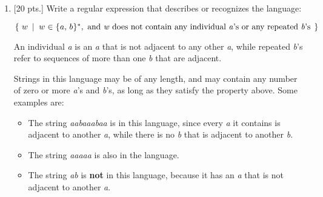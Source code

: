 \documentclass[11pt]{article}
\newcommand{\sms}{\ensuremath{\hspace{.1mm}}}
\begin{document}
  \begin{enumerate}


    \item {[20 pts.]} \label{re-question} Write a regular expression that
          describes or recognizes the language:

          \begin{centering}

            \vspace{-.5mm}

            \(
              \left\{
                \
                w \
                \left| \ \:
                w \sms \in \sms \{ \sms a, \, b \sms \}^*, \
                \textrm{and \emph{w} does not contain any individual
                        \emph{a}'s or any repeated \emph{b}'s}
                \
              \right.
              \right\}
            \)

          \end{centering}

          An individual \emph{a} is an \emph{a} that is not adjacent to any
          other \emph{a}, while repeated \emph{b}'s refer to sequences of
          more than one \emph{b} that are adjacent.

          Strings in this language may be of any length, and may contain any
          number of zero or more \emph{a}'s and \emph{b}'s, as long as they
          satisfy the property above.  Some examples are:

          \vspace{-2.5mm}

          \begin{itemize}

            \addtolength{\itemsep}{-.25mm}

            \item The string \emph{aabaaabaa} is in this language, since
                  every \emph{a} it contains is adjacent to another
                  \emph{a}, while there is no \emph{b} that is adjacent to
                  another \emph{b}.

            \item The string \emph{aaaaa} is also in the language.

            \item The string \emph{ab} is \textbf{not} in this language,
                  because it has an \emph{a} that is not adjacent to another
                  \emph{a}.


\end{itemize}
\end{enumerate}
\end{document}
